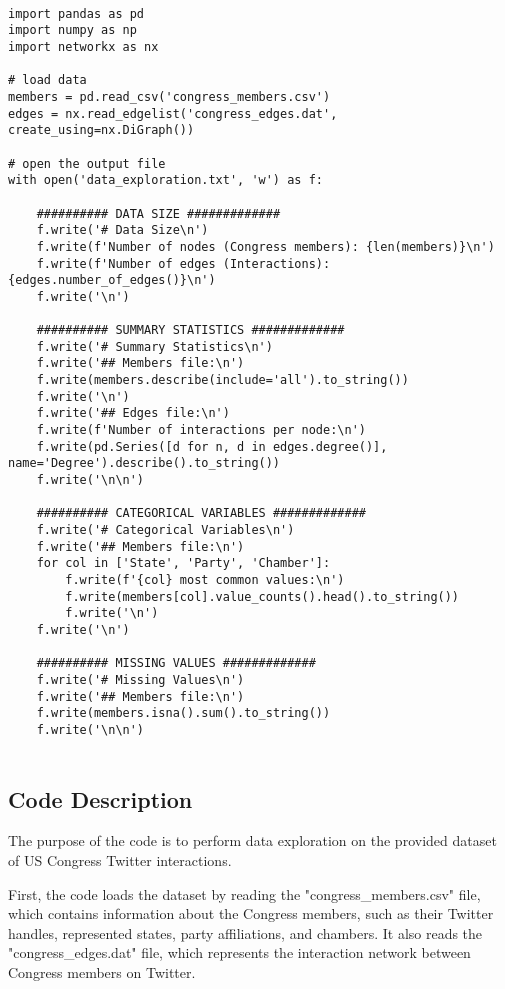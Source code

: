 \documentclass[11pt]{article}
\begin{document}
\begin{verbatim}

import pandas as pd
import numpy as np
import networkx as nx

# load data
members = pd.read_csv('congress_members.csv')
edges = nx.read_edgelist('congress_edges.dat', create_using=nx.DiGraph())

# open the output file
with open('data_exploration.txt', 'w') as f:

    ########## DATA SIZE #############
    f.write('# Data Size\n')
    f.write(f'Number of nodes (Congress members): {len(members)}\n')
    f.write(f'Number of edges (Interactions): {edges.number_of_edges()}\n')
    f.write('\n')

    ########## SUMMARY STATISTICS #############
    f.write('# Summary Statistics\n')
    f.write('## Members file:\n')
    f.write(members.describe(include='all').to_string())
    f.write('\n')
    f.write('## Edges file:\n')
    f.write(f'Number of interactions per node:\n')
    f.write(pd.Series([d for n, d in edges.degree()], name='Degree').describe().to_string())
    f.write('\n\n')

    ########## CATEGORICAL VARIABLES #############
    f.write('# Categorical Variables\n')
    f.write('## Members file:\n')
    for col in ['State', 'Party', 'Chamber']:
        f.write(f'{col} most common values:\n')
        f.write(members[col].value_counts().head().to_string())
        f.write('\n')
    f.write('\n')
    
    ########## MISSING VALUES #############
    f.write('# Missing Values\n')
    f.write('## Members file:\n')
    f.write(members.isna().sum().to_string())  
    f.write('\n\n')


\end{verbatim}

\subsection{Code Description}

The purpose of the code is to perform data exploration on the provided dataset of US Congress Twitter interactions.

First, the code loads the dataset by reading the "congress\_members.csv" file, which contains information about the Congress members, such as their Twitter handles, represented states, party affiliations, and chambers. It also reads the "congress\_edges.dat" file, which represents the interaction network between Congress members on Twitter.
\end{document}
